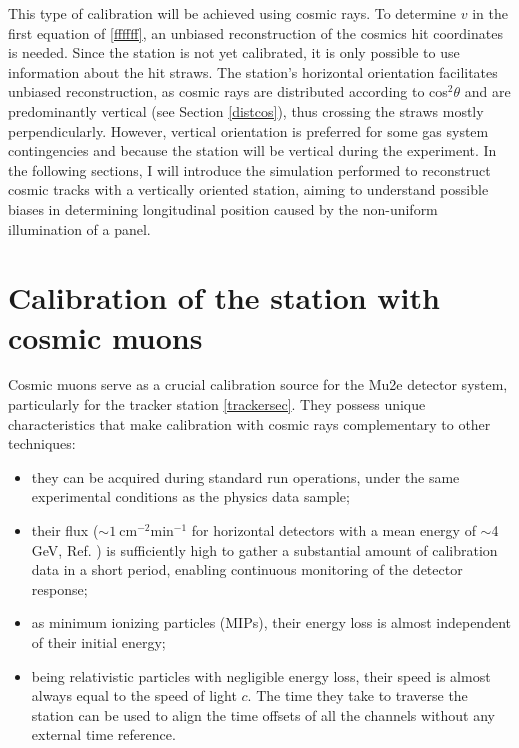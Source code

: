 This type of calibration will be achieved using cosmic rays. 
To determine $v$ in the first equation of \ref{ffffff}, an unbiased reconstruction of the cosmics hit coordinates is needed.
Since the station is not yet calibrated, it is only possible to use information about the hit straws. 
The station's horizontal orientation facilitates unbiased reconstruction, as cosmic rays are distributed according to 
cos$^2\theta$ and are predominantly vertical (see Section \ref{distcos}), thus crossing the straws mostly perpendicularly.
However, vertical orientation is preferred for some gas system contingencies and because the station will 
be vertical during the experiment. 
In the following sections, I will introduce the simulation performed to reconstruct cosmic tracks with 
a vertically oriented station, aiming to understand possible biases in determining longitudinal position caused by the non-uniform illumination of a panel.
\section{Calibration of the station with cosmic muons}
Cosmic muons serve as a crucial calibration source for the Mu2e detector system, particularly for the tracker station \ref{trackersec}. 
They possess unique characteristics that make calibration with cosmic rays complementary to other techniques:
\begin{itemize}
    \item they can be acquired during standard run operations, under the same experimental conditions as the physics data sample;
    \item their flux ($\sim 1 \ \text{cm}^{-2} \text{min}^{-1}$ for horizontal detectors with a mean
    energy of $\sim$4 GeV, Ref. \cite{muonflux}) is sufficiently high to gather a substantial amount of calibration data in a short period, 
    enabling continuous monitoring of the detector response;
    \item as minimum ionizing particles (MIPs), their energy loss is almost independent of their initial energy;
    \item being relativistic particles with negligible energy loss, their speed is almost always equal to the speed of 
    light $c$. The time they take to traverse the station can be used to align the time offsets of all the channels without any external time reference.
\end{itemize}
